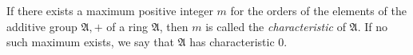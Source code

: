 If there exists a maximum positive integer $m$ for the orders of the elements of the additive group $\mathfrak{A}, +$ of a ring $\mathfrak{A}$, then $m$ is called the \emph{characteristic} of $\mathfrak{A}$. If no such maximum exists, we say that $\mathfrak{A}$ has characteristic $0$.
